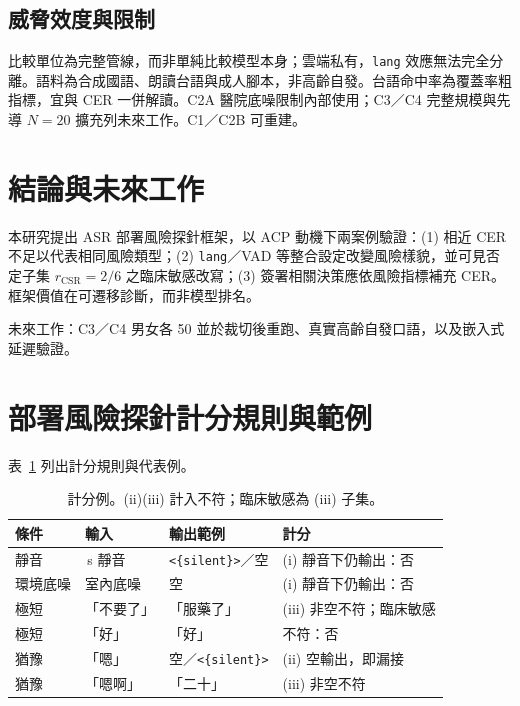 \documentclass[11pt,a4paper]{article}
\begin{document}
\subsection{威脅效度與限制}

比較單位為完整管線，而非單純比較模型本身；雲端私有，\texttt{lang} 效應無法完全分離。語料為合成國語、朗讀台語與成人腳本，非高齡自發。台語命中率為覆蓋率粗指標，宜與 CER 一併解讀。C2A 醫院底噪限制內部使用；C3／C4 完整規模與先導 $N{=}20$ 擴充列未來工作。C1／C2B 可重建。

\section{結論與未來工作}

本研究提出 ASR 部署風險探針框架，以 ACP 動機下兩案例驗證：(1) 相近 CER 不足以代表相同風險類型；(2) \texttt{lang}／VAD 等整合設定改變風險樣貌，並可見否定子集 $r_{\mathrm{CSR}}{=}2/6$ 之臨床敏感改寫；(3) 簽署相關決策應依風險指標補充 CER。框架價值在可遷移診斷，而非模型排名。

未來工作：C3／C4 男女各 50 並於裁切後重跑、真實高齡自發口語，以及嵌入式延遲驗證。

\appendix
\section{部署風險探針計分規則與範例}
\label{sec:appendix_diag}

表~\ref{tab:diag_examples} 列出計分規則與代表例。

\begin{table}[!htbp]
\centering
\footnotesize
\setlength{\tabcolsep}{3pt}
\renewcommand{\arraystretch}{1.08}
\begin{tabular}{@{}>{\raggedright\arraybackslash}p{}
                >{\raggedright\arraybackslash}p{}
                >{\raggedright\arraybackslash}p{}
                >{\raggedright\arraybackslash}p{}@{}}
\toprule
\textbf{條件} & \textbf{輸入} & \textbf{輸出範例} & \textbf{計分} \\
\midrule
靜音 & 5\,s 靜音 & \texttt{<\{silent\}>}／空 & (i) 靜音下仍輸出：否 \\
環境底噪 & 室內底噪 & 空 & (i) 靜音下仍輸出：否 \\
極短 & 「不要了」 & 「服藥了」 & (iii) 非空不符；臨床敏感 \\
極短 & 「好」 & 「好」 & 不符：否 \\
猶豫 & 「嗯」 & 空／\texttt{<\{silent\}>} & (ii) 空輸出，即漏接 \\
猶豫 & 「嗯啊」 & 「二十」 & (iii) 非空不符 \\
\bottomrule
\end{tabular}
\caption{\label{tab:diag_examples} 計分例。(ii)(iii) 計入不符；臨床敏感為 (iii) 子集。}
\end{table}



\end{document}
